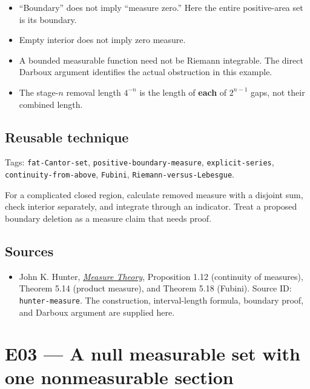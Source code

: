 \documentclass[
  11pt,
]{article}
\providecommand{\tightlist}{%
  \setlength{\itemsep}{0pt}\setlength{\parskip}{0pt}}
\begin{document}
\begin{itemize}
\tightlist
\item
  ``Boundary'' does not imply ``measure zero.'' Here the entire
  positive-area set is its boundary.
\item
  Empty interior does not imply zero measure.
\item
  A bounded measurable function need not be Riemann integrable. The
  direct Darboux argument identifies the actual obstruction in this
  example.
\item
  The stage-\(n\) removal length \(4^{-n}\) is the length of
  \textbf{each} of \(2^{n-1}\) gaps, not their combined length.
\end{itemize}

\subsection{Reusable technique}\label{reusable-technique-1}

\begingroup\small\raggedright Tags: \texttt{fat-\allowbreak{}Cantor-\allowbreak{}set}, \texttt{positive-\allowbreak{}boundary-\allowbreak{}measure},
\texttt{explicit-\allowbreak{}series}, \texttt{continuity-\allowbreak{}from-\allowbreak{}above},
\texttt{Fubini}, \texttt{Riemann-\allowbreak{}versus-\allowbreak{}Lebesgue}.\par\endgroup

For a complicated closed region, calculate removed measure with a
disjoint sum, check interior separately, and integrate through an
indicator. Treat a proposed boundary deletion as a measure claim that
needs proof.

\subsection{Sources}\label{sources-1}

\begin{itemize}
\tightlist
\item
  John K. Hunter,
  \href{https://www.math.ucdavis.edu/~hunter/measure_theory/measure_notes.pdf}{\emph{Measure
  Theory}}, Proposition 1.12 (continuity of measures), Theorem 5.14
  (product measure), and Theorem 5.18 (Fubini). Source ID:
  \texttt{hunter-\allowbreak{}measure}. The construction, interval-length formula,
  boundary proof, and Darboux argument are supplied here.
\end{itemize}

\section{E03 --- A null measurable set with one nonmeasurable
section}\label{E03}
\end{document}
